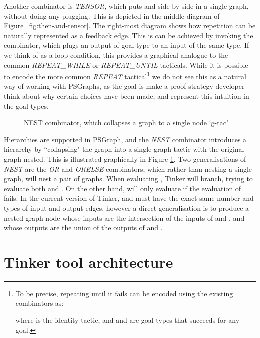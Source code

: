 \documentclass[submission,copyright,creativecommons]{eptcs}
\begin{document}
Another combinator is \textit{TENSOR}, which puts  and  side by side in a single graph, without doing any plugging. This is depicted in the middle diagram of Figure~\ref{fig:then-and-tensor}. The right-most diagram shows how repetition can be naturally represented as a feedback edge. This is can be achieved by invoking the  combinator, which plugs an output of goal type  to an input of the same type. If we think of  as a loop-condition, this provides a graphical analogue to the common \emph{REPEAT\_WHILE} or \emph{REPEAT\_UNTIL} tacticals. While it is possible to encode the more common \emph{REPEAT} tactical\footnote{To be precise, repeating  until it fails can be encoded using the existing combinators as:
\vspace{-4pt}

\vspace{-12pt}

\noindent where  is the identity tactic, and  and  are goal types that succeeds for any goal.} we do not see this as a natural way of working with PSGraphs, as the goal is make a proof strategy developer think about why certain choices have been made, and represent this intuition in the goal types.

\begin{figure}[h]
  \centering
  
  \vspace{-7pt}
    \caption{\label{fig:nest} NEST combinator, which collapses a graph  to a single node `g-tac'}
\end{figure}

Hierarchies are supported in PSGraph, and the \textit{NEST} combinator introduces a hierarchy by ``collapsing" the graph into a single graph tactic with the original graph nested. This is illustrated graphically in Figure  \ref{fig:nest}. Two generalisations of \textit{NEST} are the \emph{OR} and \emph{ORELSE} combinators, which rather than nesting a single graph, will nest a pair of graphs. When evaluating , Tinker will branch, trying to evaluate both  and . On the other hand,  will only evaluate  if the evaluation of  fails. In the current version of Tinker,  and  must have the exact same number and types of input and output edges, however a direct generalisation is to produce a nested graph node whose inputs are the intersection of the inputs of  and , and whose outputs are the union of the outputs of  and . 


\section{Tinker tool architecture}\label{sec:arch}
\end{document}
